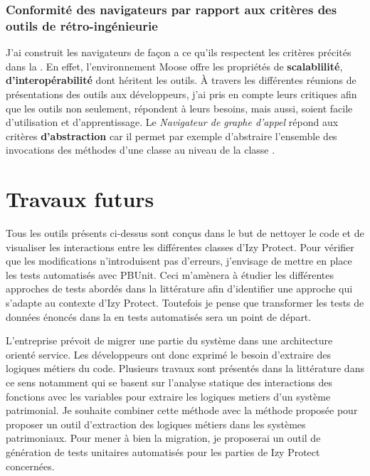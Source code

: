 \documentclass[a4paper]{article}
\begin{document}
 \subsubsection{Conformité des navigateurs par rapport aux critères des outils de rétro-ingénieurie}
J'ai construit les  navigateurs de façon a ce qu'ils respectent les critères précités dans la .
En effet, l'environnement Moose offre les propriétés de \textbf{scalablilité}, \textbf{d'interopérabilité} \cite{Duca05a} dont héritent les outils. 
À travers les différentes réunions de présentations des outils aux développeurs, j'ai pris en compte  leurs critiques  afin que les outils non seulement, répondent à leurs besoins, mais aussi, soient facile d'utilisation et d'apprentissage.
 Le \textit{Navigateur de graphe d'appel}  répond aux critères  \textbf{d'abstraction} car il permet par exemple d'abstraire l'ensemble des invocations des méthodes d'une classe au niveau de la classe .
 



\section{Travaux futurs}
\label{sec:roadmap}
Tous les outils présents ci-dessus sont conçus dans le but de nettoyer le code et de visualiser les interactions entre les différentes classes d'Izy Protect.
Pour vérifier que  les modifications n'introduisent pas d'erreurs, j'envisage de mettre en place les tests automatisés avec PBUnit. 
Ceci m'amènera à étudier les différentes approches de tests abordés dans la littérature afin d'identifier une approche qui s'adapte au contexte d'Izy Protect. 
Toutefois je pense que transformer les tests de données énoncés dans la  en tests automatisés sera un point de départ. 

L'entreprise prévoit de migrer une partie du système dans une architecture orienté service. 
Les développeurs ont donc exprimé le besoin d'extraire des logiques métiers du code.
Plusieurs travaux sont présentés dans la littérature dans ce sens  notamment \cite{Lei05a,Cose12a,Norm12a} qui se basent sur l'analyse statique des interactions des fonctions avec les variables pour extraire les logiques metiers d'un système patrimonial. 
Je souhaite combiner cette méthode avec la méthode proposée \cite{anqu19a} pour proposer un outil d'extraction des logiques métiers dans les systèmes patrimoniaux.
Pour mener à bien la migration, je proposerai un outil de génération de tests unitaires automatisés pour les parties de Izy Protect concernées.
\end{document}
